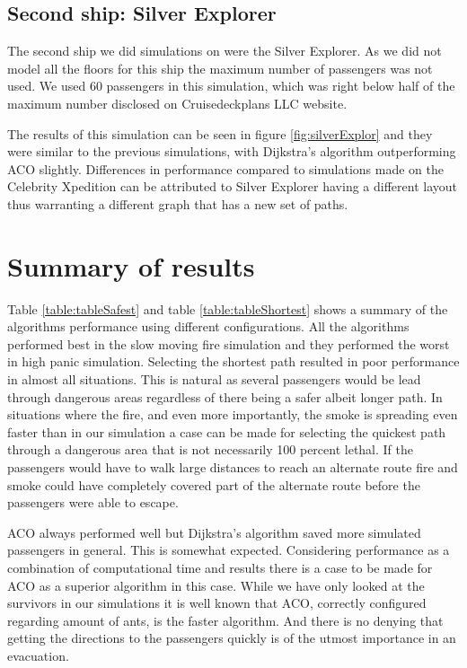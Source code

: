 \subsection{Second ship: Silver Explorer}
The second ship we did simulations on were the Silver Explorer. As we did not model all the floors for this ship the maximum number of passengers was not used. We used 60 passengers in this simulation, which was right below half of the maximum number disclosed on Cruisedeckplans LLC website\cite{cruseships}.

The results of this simulation can be seen in figure \ref{fig:silverExplor} and they were similar to the previous simulations, with Dijkstra's algorithm outperforming ACO slightly. Differences in performance compared to simulations made on the Celebrity Xpedition can be attributed to Silver Explorer having a different layout thus warranting a different graph that has a new set of paths.

\section{Summary of results}

Table \ref{table:tableSafest} and table \ref{table:tableShortest} shows a summary of the algorithms performance using different configurations. All the algorithms performed best in the slow moving fire simulation and they performed the worst in high panic simulation. Selecting the shortest path resulted in poor performance in almost all situations. This is natural as several passengers would be lead through dangerous areas regardless of there being a safer albeit longer path. In situations where the fire, and even more importantly, the smoke is spreading even faster than in our simulation a case can be made for selecting the quickest path through a dangerous area that is not necessarily 100 percent lethal. If the passengers would have to walk large distances to reach an alternate route fire and smoke could have completely covered part of the alternate route before the passengers were able to escape.

ACO always performed well but Dijkstra's algorithm saved more simulated passengers in general. This is somewhat expected. Considering performance as a combination of computational time and results there is a case to be made for ACO as a superior algorithm in this case. While we have only looked at the survivors in our simulations it is well known that ACO, correctly configured regarding amount of ants, is the faster algorithm. And there is no denying that getting the directions to the passengers quickly is of the utmost importance in an evacuation. 

